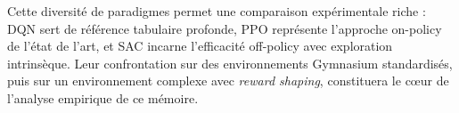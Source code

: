 \noindent Cette diversité de paradigmes permet une comparaison expérimentale riche : DQN sert de référence tabulaire profonde, PPO représente l'approche on-policy de l'état de l'art, et SAC incarne l'efficacité off-policy avec exploration intrinsèque. Leur confrontation sur des environnements Gymnasium standardisés, puis sur un environnement complexe avec \textit{reward shaping}, constituera le cœur de l'analyse empirique de ce mémoire.